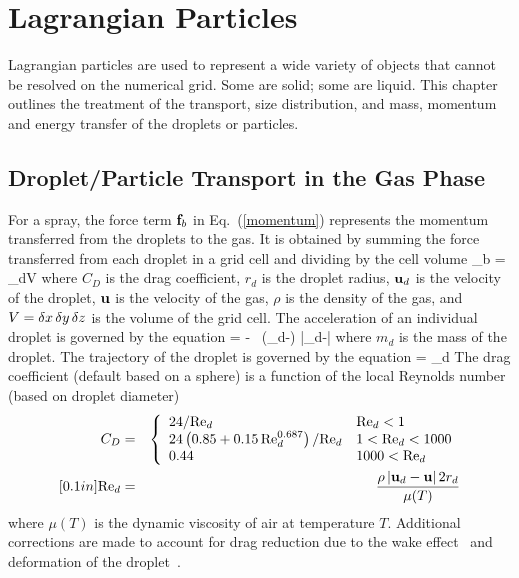 
\chapter{Lagrangian Particles}
\label{chapter:lagrangian_particles}

Lagrangian particles are used to represent a wide variety of objects that cannot be resolved on
the numerical grid. Some are solid; some are liquid. This chapter outlines the treatment of the transport, size
distribution, and mass, momentum and energy transfer of the droplets or particles.

\section{Droplet/Particle Transport in the Gas Phase}

For a spray, the force term ${\bf f}_b$ in Eq.~(\ref{momentum})
represents the momentum transferred from the droplets to the gas.
It is obtained by summing the force transferred from each droplet
in a grid cell and dividing by the cell volume
\be
    {\bof_b} =  \sum_{d\in V} 
\ee
where $C_D$ is the drag coefficient, $r_d$ is the droplet radius,
${\bf u}_d$ is the velocity of the droplet, ${\bf u}$ is the
velocity of the gas, $\rho$ is the density of the gas,
and $V = \delta x \, \delta y \, \delta z$ is the volume of the grid cell.
The acceleration of an individual droplet is governed by the equation
\be
     = \bg - \ha {} \,
    (\bu_d-\bu) |\bu_d-\bu|
\ee
where $m_d$ is the mass of the droplet.  The trajectory of the droplet is governed by the equation
\be
     = \bu_d
\ee
The drag coefficient (default based on a sphere) is a function of the local Reynolds number (based on droplet diameter)
\begin{eqnarray}
 C_D &=& \left\{ \begin{array}{ll}
     24/\hbox{Re}_d                                       & \hbox{Re}_d < 1    \\
     24\left(0.85+0.15 \, \hbox{Re}_d^{0.687} \right)/\hbox{Re}_d  & 1 < \hbox{Re}_d < 1000 \\
     0.44                                           & 1000 < \hbox{Re}_d
     \end{array} \right.  \\ [0.1in]
\hbox{Re}_d &=& \frac{\rho \, |{\bf u}_d-{\bf u}| \, 2 r_d}{\mu(T)} \end{eqnarray}
where $\mu(T)$ is the dynamic viscosity of air at temperature $T$. Additional corrections are made to account for drag reduction due to the wake effect~\cite{Ramirez:1} and deformation of the droplet~\cite{Loth:1}.



